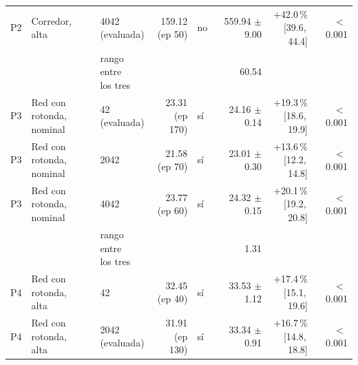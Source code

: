 \begin{table}[H]
\begin{tabular}{lllrlrrr}
P2 & \makecell[l]{Corredor,\\{}alta} & \makecell[l]{4042\\{}(evaluada)} & \makecell[r]{159.12\\{}(ep 50)} & no & \makecell[r]{559.94\\{}$\pm$ 9.00} & \makecell[r]{+42.0\,\%\\{}[39.6,\,44.4]} & $<$\,0.001 \\
 & & \makecell[l]{rango entre\\{}los tres} & & & 60.54 & & \\
P3 & \makecell[l]{Red con rotonda,\\{}nominal} & \makecell[l]{42\\{}(evaluada)} & \makecell[r]{23.31\\{}(ep 170)} & sí & \makecell[r]{24.16\\{}$\pm$ 0.14} & \makecell[r]{+19.3\,\%\\{}[18.6,\,19.9]} & $<$\,0.001 \\
P3 & \makecell[l]{Red con rotonda,\\{}nominal} & 2042 & \makecell[r]{21.58\\{}(ep 70)} & sí & \makecell[r]{23.01\\{}$\pm$ 0.30} & \makecell[r]{+13.6\,\%\\{}[12.2,\,14.8]} & $<$\,0.001 \\
P3 & \makecell[l]{Red con rotonda,\\{}nominal} & 4042 & \makecell[r]{23.77\\{}(ep 60)} & sí & \makecell[r]{24.32\\{}$\pm$ 0.15} & \makecell[r]{+20.1\,\%\\{}[19.2,\,20.8]} & $<$\,0.001 \\
 & & \makecell[l]{rango entre\\{}los tres} & & & 1.31 & & \\
P4 & \makecell[l]{Red con rotonda,\\{}alta} & 42 & \makecell[r]{32.45\\{}(ep 40)} & sí & \makecell[r]{33.53\\{}$\pm$ 1.12} & \makecell[r]{+17.4\,\%\\{}[15.1,\,19.6]} & $<$\,0.001 \\
P4 & \makecell[l]{Red con rotonda,\\{}alta} & \makecell[l]{2042\\{}(evaluada)} & \makecell[r]{31.91\\{}(ep 130)} & sí & \makecell[r]{33.34\\{}$\pm$ 0.91} & \makecell[r]{+16.7\,\%\\{}[14.8,\,18.8]} & $<$\,0.001 \\

\end{tabular}
\end{table}
